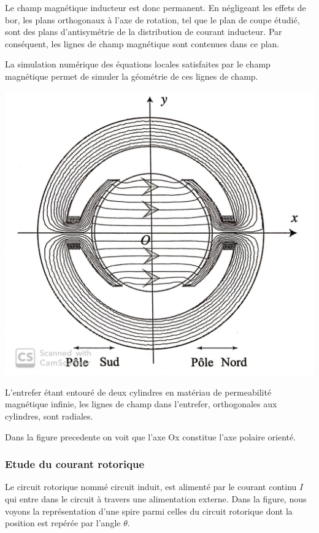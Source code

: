 \documentclass{article}
\begin{document}
Le champ magnétique inducteur est donc permanent. En négligeant les effets de bor, les plans orthogonaux à l'axe de rotation, tel que le plan de coupe étudié, sont des plans d'antisymétrie de la distribution de courant inducteur. Par conséquent, les lignes de champ magnétique sont contenues dans ce plan.\medskip

La simulation numérique des équations locales satisfaites par le champ magnétique permet de simuler la géométrie de ces lignes de champ.\medskip

\begin{center}
    \includegraphics[scale=0.1]{LC.jpg}
\end{center}

L'entrefer étant entouré de deux cylindres en matériau de permeabilité magnétique infinie, les lignes de champ dans l'entrefer, orthogonales aux cylindres, sont radiales.\medskip

Dans la figure precedente on voit que l'axe Ox constitue l'axe polaire orienté.

\subsubsection*{Etude du courant rotorique}

Le circuit rotorique nommé circuit induit, est alimenté par le courant continu $I$ qui entre dans le circuit à travers une alimentation externe. Dans la figure, nous voyons la représentation d'une spire parmi celles du circuit rotorique dont la position est repérée par l'angle $\theta$. \medskip
\end{document}
